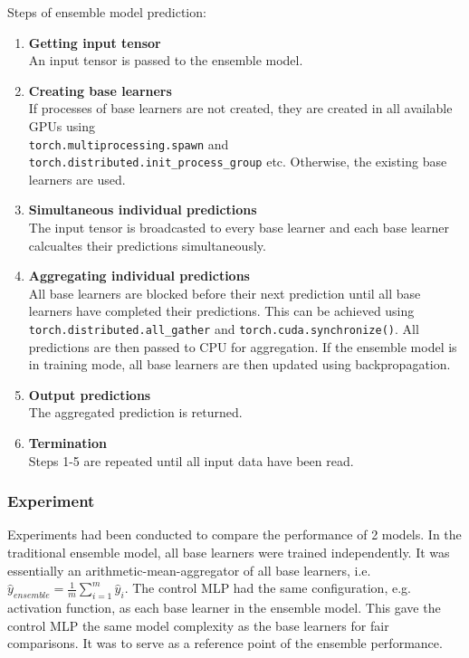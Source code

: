 \documentclass{article}
\begin{document}
Steps of ensemble model prediction: 

\begin{enumerate}
    \item \textbf{Getting input tensor} \\
    An input tensor is passed to the ensemble model. 

    \item \textbf{Creating base learners} \\
    If processes of base learners are not created, they are created in all available GPUs using 
    \\
    \texttt{torch.multiprocessing.spawn} and \texttt{torch.distributed.init\_process\_group} etc. Otherwise, the existing base learners are used. 

    \item \textbf{Simultaneous individual predictions} \\
    The input tensor is broadcasted to every base learner and each base learner calcualtes their predictions simultaneously. 

    \item \textbf{Aggregating individual predictions} \\
    All base learners are blocked before their next prediction until all base learners have completed their predictions. This can be achieved using \texttt{torch.distributed.all\_gather} and \texttt{torch.cuda.synchronize()}. All predictions are then passed to CPU for aggregation. If the ensemble model is in training mode, all base learners are then updated using backpropagation. 

    \item \textbf{Output predictions} \\
    The aggregated prediction is returned. 

    \item \textbf{Termination} \\
    Steps 1-5 are repeated until all input data have been read. 
\end{enumerate}


\subsubsection{Experiment}
Experiments had been conducted to compare the performance of 2 models. In the traditional ensemble model, all base learners were trained independently. It was essentially an arithmetic-mean-aggregator of all base learners, i.e. $\hat{y}_{ensemble} = \frac{1}{m} \sum_{i=1}^{m} \hat{y}_i$. The control MLP had the same configuration, e.g. activation function, as each base learner in the ensemble model. This gave the control MLP the same model complexity as the base learners for fair comparisons. It was to serve as a reference point of the ensemble performance. 
\end{document}
